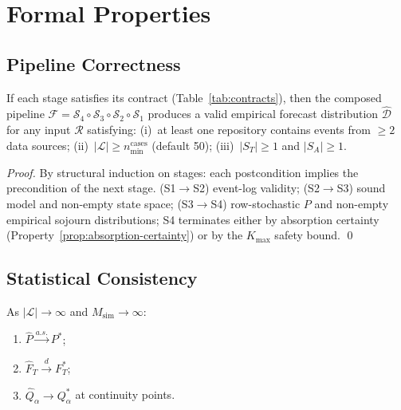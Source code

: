 
\section{Formal Properties}
\label{sec:properties}

\subsection{Pipeline Correctness}
\label{sec:prop-correctness}

\begin{theorem}
\label{thm:pipeline-correctness}
If each stage satisfies its contract (Table~\ref{tab:contracts}), then
the composed pipeline $\mathcal{F} = \mathcal{S}_4 \circ \mathcal{S}_3
\circ \mathcal{S}_2 \circ \mathcal{S}_1$ produces a valid empirical
forecast distribution $\hat{\mathcal{D}}$ for any input $\mathcal{R}$
satisfying:
(i)~at least one repository contains events from $\ge 2$ data sources;
(ii)~$|\mathcal{L}| \ge n_{\min}^{\text{cases}}$ (default 50);
(iii)~$|S_T| \ge 1$ and $|S_A| \ge 1$.
\end{theorem}

\begin{proof}
By structural induction on stages: each postcondition implies the
precondition of the next stage. (S1$\to$S2) event-log validity;
(S2$\to$S3) sound model and non-empty state space; (S3$\to$S4)
row-stochastic $P$ and non-empty empirical sojourn distributions; S4
terminates either by absorption certainty
(Property~\ref{prop:absorption-certainty}) or by the $K_{\max}$ safety
bound. \qed
\end{proof}

\subsection{Statistical Consistency}
\label{sec:prop-consistency}

\begin{theorem}
\label{thm:consistency}
As $|\mathcal{L}| \to \infty$ and $M_{\text{sim}} \to \infty$:
\begin{enumerate}
    \item[(i)] $\hat{P} \xrightarrow{a.s.} P^*$;
    \item[(ii)] $\hat{F}_T \xrightarrow{d} F_T^*$;
    \item[(iii)] $\hat{Q}_\alpha \to Q_\alpha^*$ at continuity points.
\end{enumerate}
\end{theorem}

